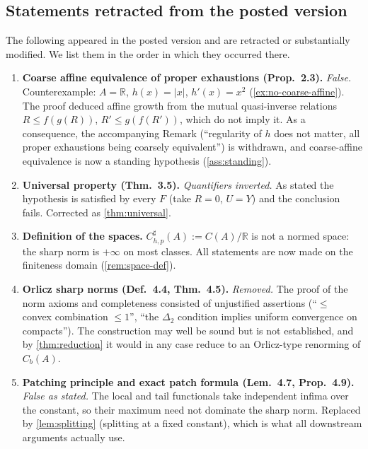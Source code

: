 \documentclass[11pt,a4paper]{article}
\numberwithin{equation}{section}
\theoremstyle{plain}
\theoremstyle{definition}
\theoremstyle{remark}
\newcommand{\R}{\mathbb{R}}
\newcommand{\Cb}{C_b}
\begin{document}
\subsection{Statements retracted from the posted version}
\label{app:part-posted}

The following appeared in the posted version and are retracted or substantially modified.
We list them in the order in which they occurred there.

\begin{enumerate}

\item \textbf{Coarse affine equivalence of proper exhaustions (Prop.~2.3).}
\emph{False.} Counterexample: $A=\R$, $h(x)=|x|$, $h'(x)=x^{2}$
(\cref{ex:no-coarse-affine}). The proof deduced affine growth from the mutual
quasi-inverse relations $R\le f(g(R))$, $R'\le g(f(R'))$, which do not imply it. As a
consequence, the accompanying Remark (``regularity of $h$ does not matter, all proper
exhaustions being coarsely equivalent'') is withdrawn, and coarse-affine equivalence is
now a standing hypothesis (\cref{ass:standing}).

\item \textbf{Universal property (Thm.~3.5).} \emph{Quantifiers inverted.} As stated the
hypothesis is satisfied by every $F$ (take $R=0$, $U=Y$) and the conclusion fails.
Corrected as \cref{thm:universal}.

\item \textbf{Definition of the spaces.} $C^{\sharp}_{h,p}(A):=C(A)/\R$ is not a normed
space: the sharp norm is $+\infty$ on most classes. All statements are now made on the
finiteness domain (\cref{rem:space-def}).

\item \textbf{Orlicz sharp norms (Def.~4.4, Thm.~4.5).} \emph{Removed.} The proof of the
norm axioms and completeness consisted of unjustified assertions (``$\le$ convex
combination $\le1$'', ``the $\Delta_2$ condition implies uniform convergence on
compacts''). The construction may well be sound but is not established, and by
\cref{thm:reduction} it would in any case reduce to an Orlicz-type renorming of $\Cb(A)$.

\item \textbf{Patching principle and exact patch formula (Lem.~4.7, Prop.~4.9).}
\emph{False as stated.} The local and tail functionals take independent infima over the
constant, so their maximum need not dominate the sharp norm. Replaced by
\cref{lem:splitting} (splitting at a fixed constant), which is what all downstream
arguments actually use.


\end{enumerate}
\end{document}
